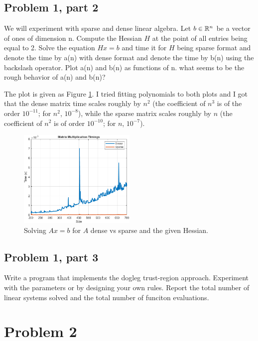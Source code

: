 \subsection{Problem 1, part 2}
We will experiment with sparse and dense linear algebra. Let $b \in \mathbb{R}^n$ be a vector of ones of dimension n. Compute the Hessian $H$ at the point of all entries being equal to 2. Solve the equation $Hx = b$ and time it for $H$ being sparse format and denote the time by a(n) with dense format and denote the time by b(n) using the backslash operator. Plot a(n) and b(n) as functions of n. what seems to be the rough behavior of a(n) and b(n)? 
\partbreak
\begin{solution}

    The plot is given as Figure \ref{fig:MatMult}. I tried fitting polynomials to both plots and I got that the dense matrix time scales roughly by $n^2$ (the coefficient of $n^3$ is of the order $10^{-11}$; for $n^2$, $10^{-8}$), while the sparse matrix scales roughly by $n$ (the coefficient of $n^2$ is of order $10^{-10}$; for $n$, $10^{-7}$). 
\end{solution}
\vspace{4cm}
\begin{figure}[!h]
    \centering
    \includegraphics[width = 0.5\textwidth]{Plots/MatrixMultiplicationTimings.png}
    \caption{Solving $Ax = b$ for $A$ dense vs sparse and the given Hessian.}
    \label{fig:MatMult}
\end{figure}

\newpage
\subsection{Problem 1, part 3}
Write a program that implements the dogleg trust-region approach. Experiment with the parameters or by designing your own rules. Report the total number of linear systems solved and the total number of funciton evaluations.

\newpage
\section{Problem 2}

